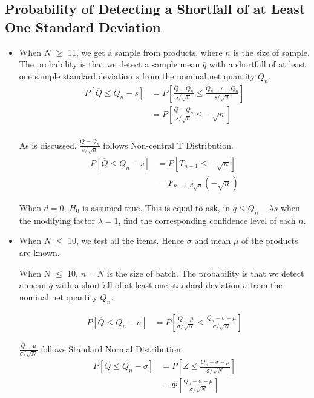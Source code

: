 \documentclass[a4paper]{article}
\begin{document}
\newpage

\subsection{Probability of Detecting a Shortfall of at Least One Standard Deviation}
\begin{itemize}
    \item When $N$ $\geq$ 11, we get a sample from products, where $n$ is the size of sample. The probability is that we detect a sample mean $\overline{q}$ with a shortfall of at least one sample standard deviation $s$ from the nominal net quantity $Q_n$.
    \begin{align*}
        P[\overline{Q} \leq Q_n - s]
        &=P[\frac{\overline{Q} - Q_n}{s/\sqrt{n}}\leq \frac{Q_n - s - Q_n}{s/\sqrt{n}}]\\
        &=P[\frac{\overline{Q} - Q_n}{s/\sqrt{n}}\leq-\sqrt{n}]\\
    \end{align*}
    
    As is discussed, $\displaystyle\frac{\overline{Q} - Q_n}{s/\sqrt{n}}$ follows Non-central T Distribution.
    \begin{align*}
        P[\overline{Q} \leq Q_n - s]
        &=P[T_{n-1} \leq -\sqrt{n}]\\
        &=F_{n-1,d\sqrt{n}}(-\sqrt{n})
    \end{align*}
    
    When $d=0$, $H_0$ is assumed true. This is equal to ask, in $\overline{q}\leq Q_n-\lambda s$ when the modifying factor $\lambda=1$, find the corresponding confidence level of each $n$.
    \item When $N$ $\leq$ 10, we test all the items. Hence $\sigma$ and mean $\mu$ of the products are known.
    
    When N $\leq$ 10, $n=N$ is the size of batch. The probability is that we detect a mean $\overline{q}$ with a shortfall of at least one standard deviation $\sigma$ from the nominal net quantity $Q_n$.
    
    \begin{align*}
        P[\overline{Q}\leq Q_n -\sigma]
        &=P[\frac{\overline{Q}-\mu}{\sigma/\sqrt{N}}\leq \frac{Q_n -\sigma-\mu}{\sigma/\sqrt{N}}]
    \end{align*}
    
    $\displaystyle\frac{\overline{Q}-\mu}{\sigma/\sqrt{N}}$ follows Standard Normal Distribution.
    \begin{align*}
        P[\overline{Q}\leq Q_n -\sigma]
        &=P[Z\leq \frac{Q_n -\sigma-\mu}{\sigma/\sqrt{N}}]\\
        &=\Phi [\frac{Q_n -\sigma-\mu}{\sigma/\sqrt{N}}]
    \end{align*}
\end{itemize}
\end{document}
